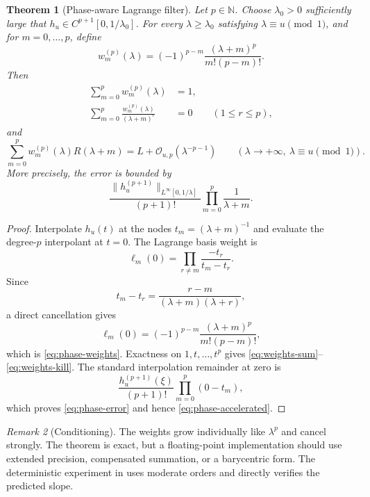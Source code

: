 \documentclass[11pt,oneside]{article}
\newtheorem{theorem}{Theorem}[section]
\theoremstyle{definition}
\theoremstyle{remark}
\newtheorem{remark}[theorem]{Remark}
\newcommand{\N}{\mathbb N}
\newcommand{\bigO}{\mathcal O}
\begin{document}
\begin{theorem}[Phase-aware Lagrange filter]
\label{thm:phase-lagrange}
Let $p\in\N$.  Choose $\lambda_0>0$ sufficiently large that
$h_u\in C^{p+1}[0,1/\lambda_0]$.  For every $\lambda\ge\lambda_0$ satisfying
$\lambda\equiv u\pmod1$, and for $m=0,\ldots,p$, define
\begin{equation}
 w_m^{(p)}(\lambda)
 =(-1)^{p-m}\frac{(\lambda+m)^p}{m!(p-m)!}.                  \label{eq:phase-weights}
\end{equation}
Then
\begin{align}
 \sum_{m=0}^{p}w_m^{(p)}(\lambda)&=1,                       \label{eq:weights-sum}\\
 \sum_{m=0}^{p}\frac{w_m^{(p)}(\lambda)}{(\lambda+m)^r}&=0
 \qquad(1\le r\le p),                                      \label{eq:weights-kill}
\end{align}
and
\begin{equation}
 \sum_{m=0}^{p}w_m^{(p)}(\lambda)R(\lambda+m)
 =L+\bigO_{u,p}(\lambda^{-p-1})
 \qquad(\lambda\to+\infty,\ \lambda\equiv u\!\pmod1).    \label{eq:phase-accelerated}
\end{equation}
More precisely, the error is bounded by
\begin{equation}
 \frac{\|h_u^{(p+1)}\|_{L^\infty[0,1/\lambda]}}{(p+1)!}
 \prod_{m=0}^{p}\frac{1}{\lambda+m}.                        \label{eq:phase-error}
\end{equation}
\end{theorem}

\begin{proof}
Interpolate $h_u(t)$ at the nodes
$t_m=(\lambda+m)^{-1}$ and evaluate the degree-$p$ interpolant at $t=0$.  The Lagrange basis
weight is
\[
 \ell_m(0)=\prod_{r\ne m}\frac{-t_r}{t_m-t_r}.
\]
Since
\[
 t_m-t_r=\frac{r-m}{(\lambda+m)(\lambda+r)},
\]
a direct cancellation gives
\[
 \ell_m(0)
 =(-1)^{p-m}\frac{(\lambda+m)^p}{m!(p-m)!},
\]
which is \eqref{eq:phase-weights}.  Exactness on $1,t,\ldots,t^p$ gives
\eqref{eq:weights-sum}--\eqref{eq:weights-kill}.  The standard interpolation remainder at
zero is
\[
 \frac{h_u^{(p+1)}(\xi)}{(p+1)!}\prod_{m=0}^{p}(0-t_m),
\]
which proves \eqref{eq:phase-error} and hence \eqref{eq:phase-accelerated}.
\end{proof}

\begin{remark}[Conditioning]
The weights grow individually like $\lambda^p$ and cancel strongly.  The theorem is exact,
but a floating-point implementation should use extended precision, compensated summation,
or a barycentric form.  The deterministic experiment in  uses moderate
orders and directly verifies the predicted slope.
\end{remark}
\end{document}
